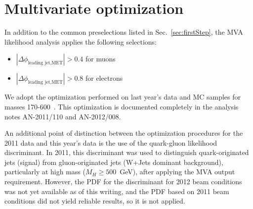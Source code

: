 \section{Multivariate optimization}
\label{sec:mvaoptimization}

In addition to the common preselections listed in Sec.~\ref{sec:firstStep}, the
MVA likelihood analysis applies the following selections:

\begin{itemize}
\item $|\Delta\phi_{\textrm{leading jet,MET}}| > 0.4$ for muons
\item $|\Delta\phi_{\textrm{leading jet,MET}}| > 0.8$ for electrons
\end{itemize}

We adopt the optimization performed on last year's data and MC samples
for masses 170-600~\GeV.  This optimization is documented completely
in the analysis notes AN-2011/110 and AN-2012/008. 


An additional point of distinction between the optimization procedures
for the 2011 data and this year's data is the use of the quark-gluon
likelihood discriminant. In 2011, this discriminant was used to
distinguish quark-originated jets (signal) from gluon-originated jets
(W+Jets dominant background), particularly at high mass ($M_{H}\geq
500$~GeV), after applying the MVA output requirement. However, the PDF
for the discriminant for 2012 beam conditions was not yet available as
of this writing, and the PDF based on 2011 beam conditions did not
yield reliable results, so it is not applied.
